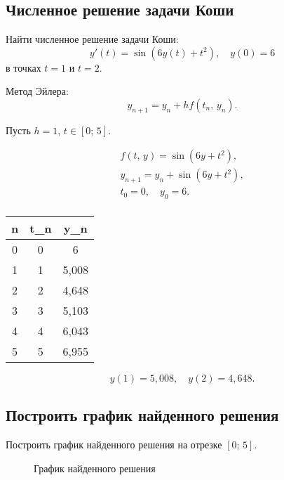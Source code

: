 \documentclass[10pt, a4paper, titlepage]{article}
\begin{document}
\subsection*{Численное решение задачи Коши}

Найти численное решение задачи Коши: $$y'(t)=\sin(6y(t)+t^2), \quad y(0)=6$$ в точках $t=1$ и $t=2$.

Метод Эйлера:
$$y_{n+1}=y_n+hf(t_n,\,y_n) .$$

Пусть $h=1$, $t\in[0;\,5]$.

\begin{gather*}
    f(t,\,y)=\sin(6y+t^2) ,\\
    y_{n+1}=y_n+\sin(6y+t^2) ,\\
    t_0=0 , \quad y_0=6 . \\
\end{gather*}

\begin{center}
    \begin{tabular}{|*{3}{C|}}
        \hline
        n & t_n & y_n \\  & 0 & 6 \\  & 1 & 5,008 \\  & 2 & 4,648 \\  & 3 & 5,103 \\  & 4 & 6,043 \\  & 5 & 6,955 \\ \hline
    \end{tabular}
\end{center}

$$y(1)=5,008 , \quad y(2)=4,648 .$$

\subsection*{Построить график найденного решения}

Построить график найденного решения на отрезке $[0;\,5]$.

\begin{figure}[H]
    \centering
    \caption{График найденного решения}
\end{figure}
\end{document}
